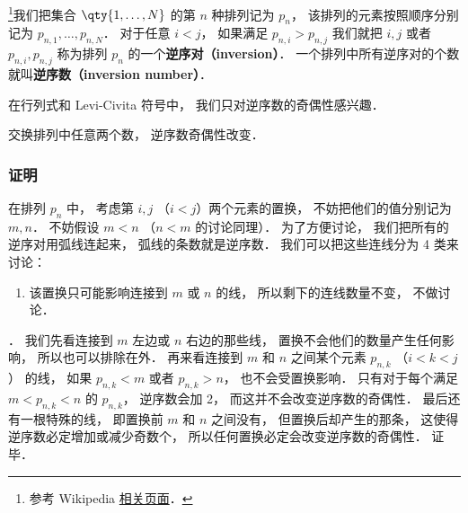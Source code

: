 
\begin{issues}
\issueDraft
\end{issues}


\footnote{参考 Wikipedia \href{https://en.wikipedia.org/wiki/Inversion_(discrete_mathematics)}{相关页面}．}我们把集合 $\qty{1,\dots,N}$ 的第 $n$ 种排列记为 $p_n$， 该排列的元素按照顺序分别记为 $p_{n,1}, \dots, p_{n,N}$． 对于任意 $i < j$， 如果满足 $p_{n,i} > p_{n,j}$ 我们就把 $i, j$ 或者 $p_{n,i}, p_{n,j}$ 称为排列 $p_n$ 的一个\textbf{逆序对（inversion）}． 一个排列中所有逆序对的个数就叫\textbf{逆序数（inversion number）}．

在行列式和 Levi-Civita 符号中， 我们只对逆序数的奇偶性感兴趣． 

\begin{theorem}{}
交换排列中任意两个数， 逆序数奇偶性改变． 
\end{theorem}

\subsubsection{证明}
在排列 $p_n$ 中， 考虑第 $i, j$ （$i < j$）两个元素的置换， 不妨把他们的值分别记为 $m, n$． 不妨假设 $m < n$ （$n < m$ 的讨论同理）． 为了方便讨论， 我们把所有的逆序对用弧线连起来， 弧线的条数就是逆序数． 我们可以把这些连线分为 4 类来讨论：
\begin{enumerate}
\item 该置换只可能影响连接到 $m$ 或 $n$ 的线， 所以剩下的连线数量不变， 不做讨论．
\end{enumerate}

． 我们先看连接到 $m$ 左边或 $n$ 右边的那些线， 置换不会他们的数量产生任何影响， 所以也可以排除在外． 再来看连接到 $m$ 和 $n$ 之间某个元素 $p_{n, k}$ （$i < k < j$） 的线， 如果 $p_{n, k} < m$ 或者 $p_{n, k} > n$， 也不会受置换影响． 只有对于每个满足 $m < p_{n,k} < n$ 的 $p_{n,k}$， 逆序数会加 2， 而这并不会改变逆序数的奇偶性． 最后还有一根特殊的线， 即置换前 $m$ 和 $n$ 之间没有， 但置换后却产生的那条， 这使得逆序数必定增加或减少奇数个， 所以任何置换必定会改变逆序数的奇偶性． 证毕．
